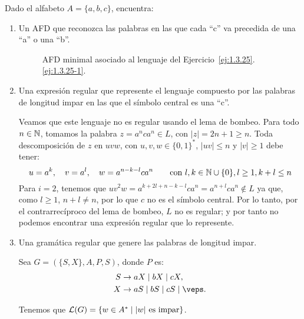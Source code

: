 \begin{ejercicio}\label{ej:1.3.25}
    Dado el alfabeto $A=\{a,b,c\}$, encuentra:
    \begin{enumerate}
        \item \label{ej:1.3.25-1}
        Un AFD que reconozca las palabras en las que cada ``c'' va precedida de una ``a'' o una ``b''.
        \begin{figure}[H]
            \centering
            \caption{AFD minimal asociado al lenguaje del Ejercicio~\ref{ej:1.3.25}.\ref{ej:1.3.25-1}.}
            \label{fig:1.3.25-1}
        \end{figure}

        \item Una expresión regular que represente el lenguaje compuesto por las palabras de longitud impar en las que el símbolo central es una ``c''.
        
        Veamos que este lenguaje no es regular usando el lema de bombeo. Para todo $n\in\mathbb{N}$, tomamos la palabra $z=a^nca^n\in L$, con $|z|=2n+1\geq n$. Toda descomposición de $z$ en $uvw$, con $u,v,w\in \{0,1\}^*$, $|uv|\leq n$ y $|v|\geq 1$ debe tener:
        \begin{equation*}
            u=a^k, \quad v=a^l, \quad w=a^{n-k-l}ca^n\qquad \text{con } l,k\in \mathbb{N}\cup \{0\}, l\geq 1, k+l\leq n
        \end{equation*}
        Para $i=2$, tenemos que $uv^2w=a^{k+2l+n-k-l}ca^n=a^{n+l}ca^n\notin L$ ya que, como $l\geq 1$, $n+l\neq n$, por lo que $c$ no es el símbolo central. Por lo tanto, por el contrarrecíproco del lema de bombeo, $L$ no es regular; y por tanto no podemos encontrar una expresión regular que lo represente.

        \item Una gramática regular que genere las palabras de longitud impar.
        
        Sea $G=(\{S,X\}, A, P, S)$, donde $P$ es:
        \begin{align*}
            S &\to aX \mid bX \mid cX, \\
            X &\to aS \mid bS \mid cS \mid \veps.
        \end{align*}

        Tenemos que $\mathcal{L}(G)=\{w\in A^* \mid |w|\text{ es impar}\}$.
    \end{enumerate}
\end{ejercicio}

